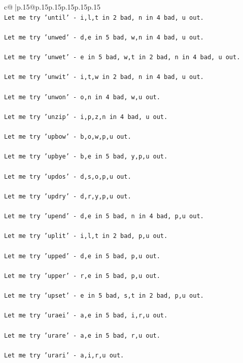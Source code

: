 \documentclass{article}
\begin{document}
{\begin{supertabular}{c@{$\;$}|p{.15\linewidth}@{}p{.15\linewidth}p{.15\linewidth}p{.15\linewidth}p{.15\linewidth}p{.15\linewidth}}
{{{\\ 
\texttt{Let me try 'until' {-} i,l,t in 2 bad, n in 4 bad, u out. } \\
\\ 
\texttt{Let me try 'unwed' {-} d,e in 5 bad, w,n in 4 bad, u out. } \\
\\ 
\texttt{Let me try 'unwet' {-} e in 5 bad, w,t in 2 bad, n in 4 bad, u out. } \\
\\ 
\texttt{Let me try 'unwit' {-} i,t,w in 2 bad, n in 4 bad, u out. } \\
\\ 
\texttt{Let me try 'unwon' {-} o,n in 4 bad, w,u out. } \\
\\ 
\texttt{Let me try 'unzip' {-} i,p,z,n in 4 bad, u out. } \\
\\ 
\texttt{Let me try 'upbow' {-} b,o,w,p,u out. } \\
\\ 
\texttt{Let me try 'upbye' {-} b,e in 5 bad, y,p,u out. } \\
\\ 
\texttt{Let me try 'updos' {-} d,s,o,p,u out. } \\
\\ 
\texttt{Let me try 'updry' {-} d,r,y,p,u out. } \\
\\ 
\texttt{Let me try 'upend' {-} d,e in 5 bad, n in 4 bad, p,u out. } \\
\\ 
\texttt{Let me try 'uplit' {-} i,l,t in 2 bad, p,u out. } \\
\\ 
\texttt{Let me try 'upped' {-} d,e in 5 bad, p,u out. } \\
\\ 
\texttt{Let me try 'upper' {-} r,e in 5 bad, p,u out. } \\
\\ 
\texttt{Let me try 'upset' {-} e in 5 bad, s,t in 2 bad, p,u out. } \\
\\ 
\texttt{Let me try 'uraei' {-} a,e in 5 bad, i,r,u out. } \\
\\ 
\texttt{Let me try 'urare' {-} a,e in 5 bad, r,u out. } \\
\\ 
\texttt{Let me try 'urari' {-} a,i,r,u out. } \\
}}}
\end{supertabular}}
\end{document}
